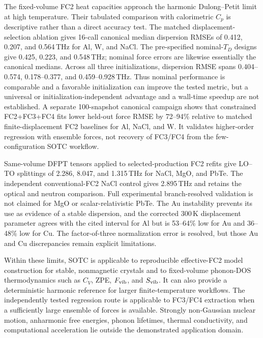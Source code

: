 \documentclass[aps,prb,reprint,amsmath,amssymb,floatfix]{revtex4-2}
\begin{document}
\color{revisionblue}
The fixed-volume FC2 heat capacities approach the harmonic Dulong--Petit limit at high temperature. Their tabulated comparison with calorimetric \(C_p\) is descriptive rather than a direct accuracy test.
The matched displacement-selection ablation gives 16-call canonical median
dispersion RMSEs of 0.412, 0.207, and 0.564\,THz for Al, W, and NaCl. The
pre-specified nominal-\(T_D\) designs give 0.425, 0.223, and 0.548\,THz;
nominal force errors are likewise essentially the canonical medians. Across
all three initializations, dispersion RMSE spans 0.404--0.574,
0.178--0.377, and 0.459--0.928\,THz. Thus nominal performance is comparable
and a favorable initialization can improve the tested metric, but a universal
or initialization-independent advantage and a wall-time speedup are not
established. A separate 100-snapshot canonical campaign shows
that constrained FC2+FC3+FC4 fits lower held-out force RMSE by 72--94\%
relative to matched finite-displacement FC2 baselines for Al, NaCl, and W.
It validates higher-order regression with ensemble forces, not recovery of
FC3/FC4 from the few-configuration SOTC workflow.
\color{black}

\color{revisionblue}
Same-volume DFPT tensors applied to selected-production FC2 refits give LO--TO
splittings of 2.286, 8.047, and 1.315\,THz for NaCl, MgO, and PbTe. The
independent conventional-FC2 NaCl control gives 2.895\,THz and retains the
optical and neutron comparison. Full experimental branch-resolved validation
is not claimed for MgO or scalar-relativistic PbTe. The Au
instability prevents its use as evidence of a stable dispersion, and the
corrected 300\,K displacement parameter agrees with the cited interval for Al
but is 53--64\% low for Au and 36--48\% low for Cu. The factor-of-three
normalization error is resolved, but those Au and Cu discrepancies remain
explicit limitations.
\color{black}

\color{revisionblue}
Within these limits, SOTC is applicable to reproducible effective-FC2 model
construction for stable, nonmagnetic crystals and to fixed-volume phonon-DOS
thermodynamics such as \(C_V\), ZPE, \(F_{\rm vib}\), and \(S_{\rm vib}\). It
can also provide a deterministic harmonic reference for larger
finite-temperature workflows. The independently tested regression route is
applicable to FC3/FC4 extraction when a sufficiently large ensemble of forces
is available. Strongly non-Gaussian nuclear motion, anharmonic free energies,
phonon lifetimes, thermal conductivity, and computational acceleration lie
outside the demonstrated application domain.
\color{black}
\end{document}
